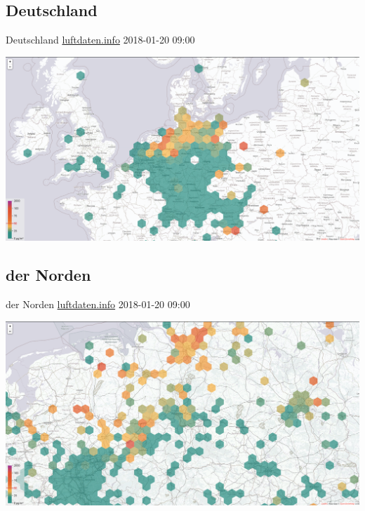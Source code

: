 \documentclass[aspectratio=169]{beamer} %
\begin{document}
\subsection{Deutschland}
\begin{frame}{Deutschland \href{http://hannover.maps.luftdaten.info/\#6/52.373/10.005}{luftdaten.info} 2018-01-20 09:00}
  \begin{center}
    \includegraphics[width=\textwidth]{../screenshots/luftdaten-zoom-f.png}
  \end{center}
\end{frame}
\subsection*{der Norden}
\begin{frame}{der Norden \href{http://hannover.maps.luftdaten.info/\#8/52.373/10.005}{luftdaten.info} 2018-01-20 09:00}
  \begin{center}
    \includegraphics[width=\textwidth]{../screenshots/luftdaten-zoom-d.png}
  \end{center}
\end{frame}
\end{document}
